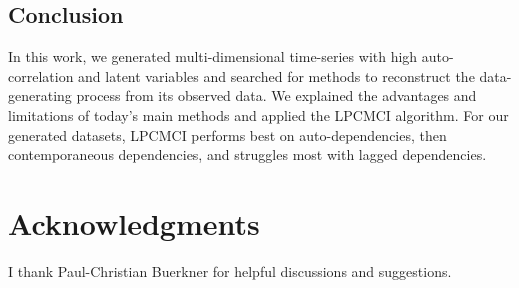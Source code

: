 \documentclass[conference]{IEEEtran}
\begin{document}
\subsection{Conclusion}
In this work, we generated multi-dimensional time-series with high auto-correlation and latent variables and searched for methods to reconstruct the data-generating process from its observed data.
We explained the advantages and limitations of today's main methods and applied the LPCMCI algorithm.
For our generated datasets, LPCMCI performs best on auto-dependencies, then contemporaneous dependencies, and struggles most with lagged dependencies.

\section{Acknowledgments}
I thank Paul-Christian Buerkner for helpful discussions and suggestions.







\end{document}
